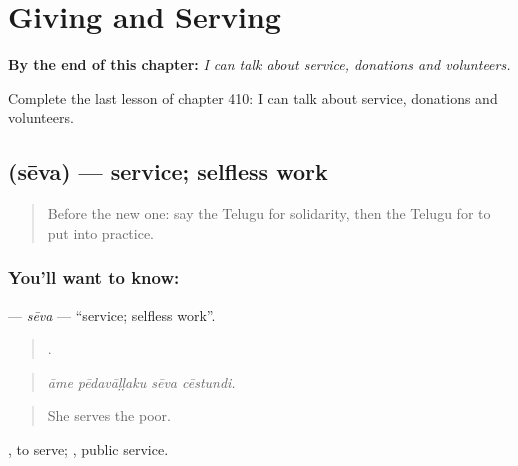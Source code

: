 
\chapter{Giving and Serving}
\label{ch:te-giving-and-serving}

\begin{chapteropening}
\textbf{By the end of this chapter:} \emph{I can talk about service, donations and volunteers.}

Complete the last lesson of chapter 410: I can talk about service, donations and volunteers.
\end{chapteropening}

\section[\texorpdfstring{\te{సేవ} (sēva)}{సేవ (sēva)}]{ (sēva) — service; selfless work}

\label{lesson:TE-C410-seva}



\begin{quote}
Before the new one: say the Telugu for solidarity, then the Telugu for to put into practice.
\end{quote}

\subsection*{You'll want to know: }
\textbf{} — \emph{sēva} — \textquotedblleft{}service; selfless work\textquotedblright{}.

\begin{quote}
   .
\end{quote}

\begin{quote}
\emph{āme pēdavāḷḷaku sēva cēstundi.}
\end{quote}

\begin{quote}
She serves the poor.
\end{quote}

 , to serve;  , public service.

